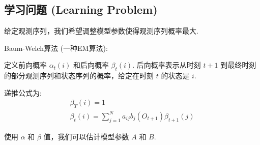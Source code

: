 \documentclass[UTF8,12pt]{ctexart}
\numberwithin{equation}{section}%
\begin{document}
	\subsection{学习问题 (Learning Problem)}

	给定观测序列，我们希望调整模型参数使得观测序列概率最大.
	
	Baum-Welch算法 (一种EM算法):
	
	定义前向概率 $\alpha_t(i)$ 和后向概率 $\beta_t(i)$. 后向概率表示从时刻 $t+1$ 到最终时刻的部分观测序列和状态序列的概率，给定在时刻 $t$ 的状态是 $i$.
	
	递推公式为:
	$$
	\begin{gathered}
		\beta_T(i)=1 \\
		\beta_t(i)=\sum_{j=1}^N a_{i j} b_j\left(O_{t+1}\right) \beta_{t+1}(j)
	\end{gathered}
	$$
	
	使用 $\alpha$ 和 $\beta$ 值，我们可以估计模型参数 $A$ 和 $B$.
	\newpage
\end{document}
